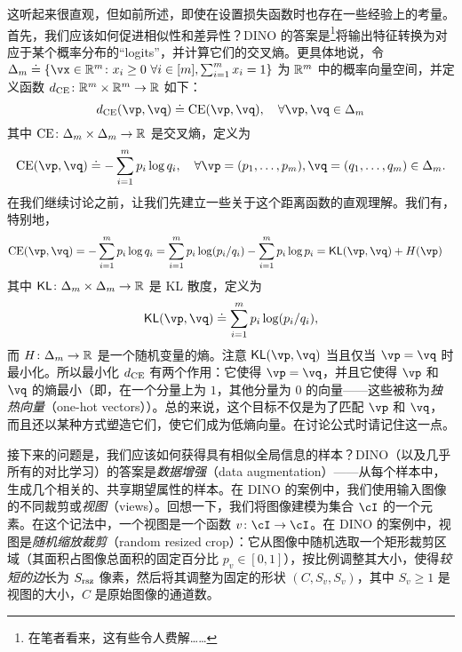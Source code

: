 \documentclass[../../book-main_zh.tex]{subfiles}
\begin{document}
这听起来很直观，但如前所述，即使在设置损失函数时也存在一些经验上的考量。首先，我们应该如何促进相似性和差异性？DINO \citep{caron2021emerging} 的答案是\footnote{在笔者看来，这有些令人费解……}将输出特征转换为对应于某个概率分布的“logits”，并计算它们的交叉熵。更具体地说，令 \(\Delta_{m} \doteq \{\vx \in \R^{m} \colon x_{i} \geq 0\ \forall i \in [m], \sum_{i = 1}^{m}x_{i} = 1\}\) 为 \(\mathbb{R}^{m}\) 中的概率向量空间，并定义函数 \(d_{\operatorname{CE}} \colon \mathbb{R}^{m} \times \mathbb{R}^{m} \to \mathbb{R}\) 如下：
 \begin{equation}\label{eq:cross_entropy_difference}
    d_{\CE}(\vp, \vq) \doteq \CE(\vp, \vq), \quad \forall \vp, \vq \in \Delta_{m}
 \end{equation}
 其中 \(\operatorname{CE} \colon \Delta_{m} \times \Delta_{m} \to \mathbb{R}\) 是交叉熵，定义为
 \begin{equation}\label{eq:expts_def_ce}
    \CE(\vp, \vq) \doteq -\sum_{i = 1}^{m}p_{i}\log q_{i}, \quad \forall \vp = (p_{1}, \dots, p_{m}), \vq = (q_{1}, \dots, q_{m}) \in \Delta_{m}.
 \end{equation}
 在我们继续讨论之前，让我们先建立一些关于这个距离函数的直观理解。我们有，特别地，
 \begin{align}
    \CE(\vp, \vq)
    &= -\sum_{i = 1}^{m}p_{i}\log q_{i} = \sum_{i = 1}^{m}p_{i}\log(p_{i}/q_{i}) - \sum_{i = 1}^{m}p_{i}\log p_{i} = \KL(\vp, \vq) + H(\vp)
 \end{align}
 其中 \(\operatorname{\mathsf{KL}} \colon \Delta_{m} \times \Delta_{m} \to \mathbb{R}\) 是 KL 散度，定义为
 \begin{equation}
    \KL(\vp, \vq) \doteq \sum_{i = 1}^{m}p_{i}\log(p_{i}/q_{i}),
 \end{equation}
 而 \(H \colon \Delta_{m} \to \mathbb{R}\) 是一个随机变量的熵。注意 \(\KL(\vp, \vq)\) 当且仅当 \(\vp = \vq\) 时最小化。所以最小化 \(d_{\operatorname{CE}}\) 有两个作用：它使得 \(\vp = \vq\)，并且它使得 \(\vp\) 和 \(\vq\) 的熵最小（即，在一个分量上为 \(1\)，其他分量为 \(0\) 的向量——这些被称为\textit{独热向量}（one-hot vectors））。总的来说，这个目标不仅是为了匹配 \(\vp\) 和 \(\vq\)，而且还以某种方式塑造它们，使它们成为低熵向量。在讨论公式时请记住这一点。

接下来的问题是，我们应该如何获得具有相似全局信息的样本？DINO（以及几乎所有的对比学习）的答案是\textit{数据增强}（data augmentation）——从每个样本中，生成几个相关的、共享期望属性的样本。在 DINO 的案例中，我们使用输入图像的不同裁剪或\textit{视图}（views）。回想一下，我们将图像建模为集合 \(\cI\) 的一个元素。在这个记法中，一个视图是一个函数 \(v \colon \cI \to \cI\)。在 DINO 的案例中，视图是\textit{随机缩放裁剪}（random resized crop）：它从图像中随机选取一个矩形裁剪区域（其面积占图像总面积的固定百分比 \(p_{v} \in [0, 1]\)），按比例调整其大小，使得\textit{较短的边}长为 \(S_{\mathrm{rsz}}\) 像素，然后将其调整为固定的形状 \((C, S_{v}, S_{v})\)，其中 \(S_{v} \geq 1\) 是视图的大小，\(C\) 是原始图像的通道数。
\end{document}
